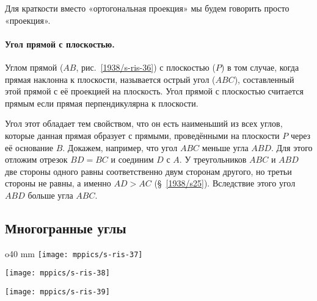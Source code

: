 Для краткости вместо «ортогональная проекция» мы будем говорить просто «проекция».

\paragraph{Угол прямой с плоскостью.}\label{1938/s48}
Углом прямой ($AB$, рис.~\ref{1938/s-ris-36}) с плоскостью ($P$) в том случае, когда прямая наклонна к плоскости, называется острый угол ($ABC$), составленный этой прямой с её проекцией на плоскость.
Угол прямой с плоскостью считается прямым если прямая перпендикулярна к плоскости.

Угол этот обладает тем свойством, что он есть наименьший из всех углов, которые данная прямая образует с прямыми, проведёнными на плоскости $P$ через её основание $B$.
Докажем, например, что угол $ABC$ меньше угла $ABD$.
Для этого отложим отрезок $BD=BC$ и соединим $D$ с $A$.
У треугольников $ABC$ и $ABD$ две стороны одного равны соответственно двум сторонам другого, но третьи стороны не равны, а именно $AD>AC$ (§~\ref{1938/s25}).
Вследствие этого угол $ABD$ больше угла $ABC$.

\subsection*{Многогранные углы}

\begin{wrapfigure}{o}{40 mm}
\vskip-4mm
\centering
\texttt{[image: mppics/s-ris-37]}
\caption{}\label{1938/s-ris-37}
\bigskip
\texttt{[image: mppics/s-ris-38]}
\caption{}\label{1938/s-ris-38}
\bigskip
\texttt{[image: mppics/s-ris-39]}
\caption{}\label{1938/s-ris-39}
\end{wrapfigure}

